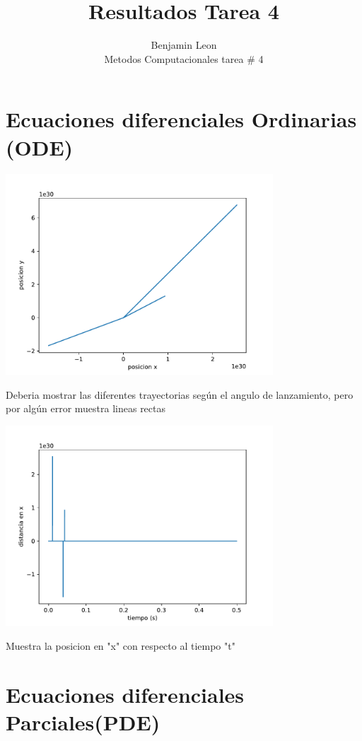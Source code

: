 \documentclass[12pt]{article}
\begin{document}
 

 
\title{Resultados Tarea 4}
\author{Benjamin Leon\\
Metodos Computacionales tarea \# 4} 
\maketitle


\section{Ecuaciones diferenciales Ordinarias (ODE)}
\begin{centering}
\includegraphics[width=0.75\textwidth]{grafsODE.pdf}

Deberia mostrar las diferentes trayectorias seg\'un el angulo de lanzamiento, pero por alg\'un error muestra lineas rectas

\includegraphics[width=0.75\textwidth]{grafsODE2.pdf}

Muestra la posicion en "x" con respecto al tiempo "t"
\end{centering}


\section{Ecuaciones diferenciales Parciales(PDE)}
\end{document}
